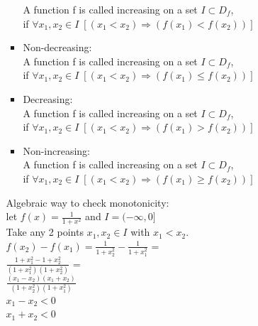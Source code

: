 \documentclass{article}
\begin{document}
\begin{enumerate}
\begin{itemize}
\begin{itemize}
		A function f is called increasing on a set $I \subset D_f$, \\
		if $\forall x_1, x_2 \in I \; [(x_1 < x_2) \Rightarrow (f(x_1) < f(x_2))]$
		\item Non-decreasing: \\
		A function f is called increasing on a set $I \subset D_f$, \\
		if $\forall x_1, x_2 \in I \; [(x_1 < x_2) \Rightarrow (f(x_1) \leq f(x_2))]$
		\item Decreasing: \\
		A function f is called increasing on a set $I \subset D_f$, \\
		if $\forall x_1, x_2 \in I \; [(x_1 < x_2) \Rightarrow (f(x_1) > f(x_2))]$
		\item Non-increasing: \\
		A function f is called increasing on a set $I \subset D_f$, \\
		if $\forall x_1, x_2 \in I \; [(x_1 < x_2) \Rightarrow (f(x_1) \geq f(x_2))]$
	\end{itemize}
	Algebraic way to check monotonicity: \\
	let $f(x) = \frac{1}{1+x^2}$ and $I = (-\infty, 0]$ \\
	Take any 2 points $x_1, x_2 \in I$ with $x_1 < x_2$. \\
	$f(x_2) - f(x_1) = \frac{1}{1+x_2^2} - \frac{1}{1+x_1^2}$ = \\
	$\frac{1+x_1^2 - 1 + x_2^2}{(1+x_1^2)(1+x_2^2)}$ = \\
	$\frac{(x_1-x_2)(x_1+x_2)}{(1+x_2^2)(1+x_1^2)}$ \\
	$x_1 - x_2  < 0$ \\
	$x_1 + x_2 < 0$ \\
	\end{itemize}
	\end{enumerate}
\end{document}
